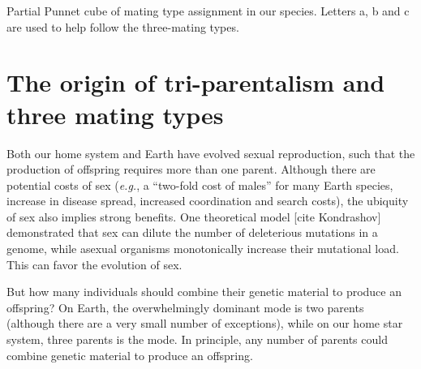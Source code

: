 \documentclass{report}
\begin{document}
\begin{table}
\centering
{}
\caption{Partial Punnet cube of mating type assignment in our species. Letters a, b and c are used to help follow the three-mating types.} 
\label{tab:punnet_us}
\end{table}


\section*{The origin of tri-parentalism and three mating types} 

Both our home system and Earth have evolved sexual reproduction, such that the production of offspring requires more than one parent. Although there are potential costs of sex (\emph{e.g.}, a ``two-fold cost of males'' for many Earth species, increase in disease spread, increased coordination and search costs), the ubiquity of sex also implies strong benefits. One theoretical model [cite Kondrashov] demonstrated that sex can dilute the number of deleterious mutations in a genome, while asexual organisms monotonically increase their mutational load. This can favor the evolution of sex. 

But how many individuals should combine their genetic material to produce an offspring? On Earth, the overwhelmingly dominant mode is two parents (although there are a very small number of exceptions), while on our home star system, three parents is the mode. In principle, any number of parents could combine genetic material to produce an offspring. 
\end{document}
